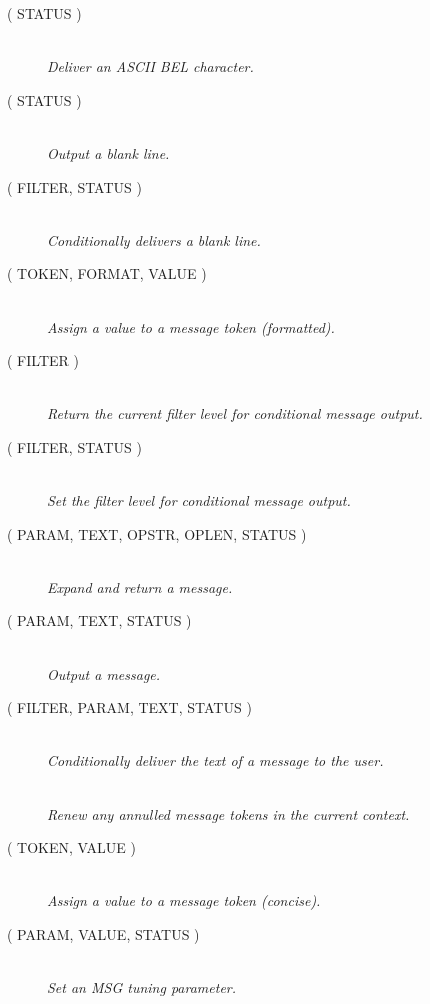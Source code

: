 \documentclass[twoside,11pt]{starlink}
\providecommand{\listline}{\hspace{1pt}\\}
\begin{document}
\begin {description}
\item [ ( STATUS )] \listline
\textit{ Deliver an ASCII BEL character.}
\item [ ( STATUS )] \listline
\textit{ Output a blank line.}
\item [ ( FILTER, STATUS )] \listline
\textit{ Conditionally delivers a blank line.}
\item [ ( TOKEN, FORMAT, VALUE )] \listline
\textit{ Assign a value to a message token (formatted).}
\item [ ( FILTER )] \listline
\textit{ Return the current filter level for conditional message
output.}
\item [ ( FILTER, STATUS )] \listline
\textit{ Set the filter level for conditional message output.}
\item [ ( PARAM, TEXT, OPSTR, OPLEN, STATUS )] \listline
\textit{ Expand and return a message. }
\item [ ( PARAM, TEXT, STATUS )] \listline
\textit{ Output a message. }
\item [ ( FILTER, PARAM, TEXT, STATUS )] \listline
\textit{ Conditionally deliver the text of a message to the user.}
\item [] \listline
\textit{ Renew any annulled message tokens in the current context.}
\item [ ( TOKEN, VALUE )] \listline
\textit{ Assign a value to a message token (concise).}
\item [ ( PARAM, VALUE, STATUS )] \listline
\textit{ Set an MSG tuning parameter.}
\end {description}
\end{document}
